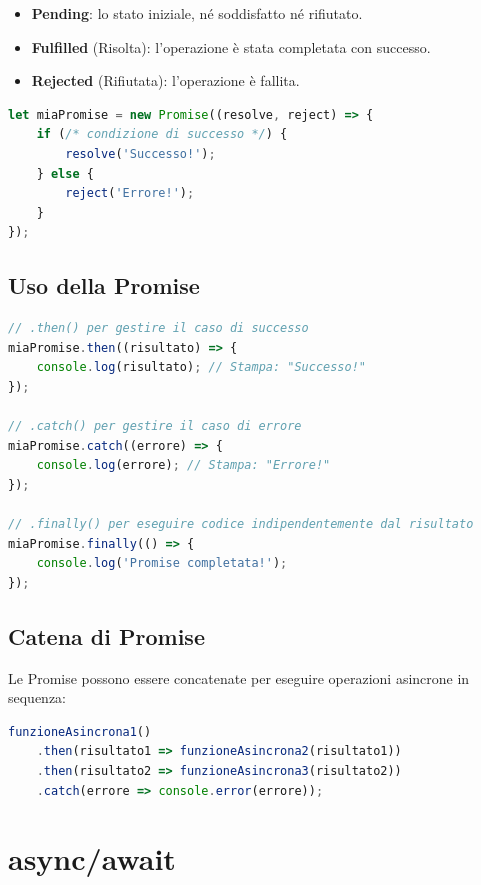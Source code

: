 \begin{itemize}
    \item \textbf{Pending}: lo stato iniziale, né soddisfatto né rifiutato.
    \item \textbf{Fulfilled} (Risolta): l'operazione è stata completata con successo.
    \item \textbf{Rejected} (Rifiutata): l'operazione è fallita.
\end{itemize}

\begin{lstlisting}[language=JavaScript]
let miaPromise = new Promise((resolve, reject) => {
    if (/* condizione di successo */) {
        resolve('Successo!');
    } else {
        reject('Errore!');
    }
});
\end{lstlisting}

\subsection{Uso della Promise}

\begin{lstlisting}[language=JavaScript]
// .then() per gestire il caso di successo
miaPromise.then((risultato) => {
    console.log(risultato); // Stampa: "Successo!"
});

// .catch() per gestire il caso di errore
miaPromise.catch((errore) => {
    console.log(errore); // Stampa: "Errore!"
});

// .finally() per eseguire codice indipendentemente dal risultato
miaPromise.finally(() => {
    console.log('Promise completata!');
});
\end{lstlisting}

\subsection{Catena di Promise}

Le Promise possono essere concatenate per eseguire operazioni asincrone in sequenza:

\begin{lstlisting}[language=JavaScript]
funzioneAsincrona1()
    .then(risultato1 => funzioneAsincrona2(risultato1))
    .then(risultato2 => funzioneAsincrona3(risultato2))
    .catch(errore => console.error(errore));
\end{lstlisting}

\section{async/await}


